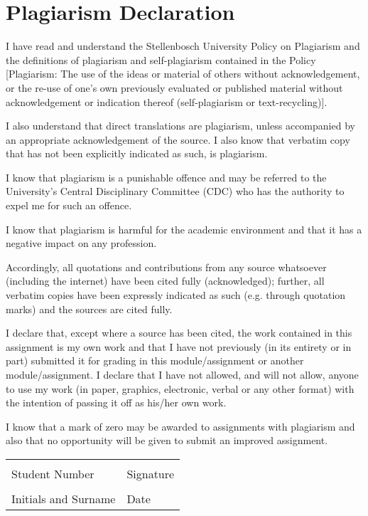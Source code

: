 \chapter*{Plagiarism Declaration}

I have read and understand the Stellenbosch University Policy on Plagiarism and the definitions of plagiarism and self-plagiarism contained in the Policy [Plagiarism: The use of the ideas or material of others without acknowledgement, or the re-use of one's own previously evaluated or published material without acknowledgement or indication thereof (self-plagiarism or text-recycling)].

I also understand that direct translations are plagiarism, unless accompanied by an appropriate acknowledgement of the source. I also know that verbatim copy that has not been explicitly indicated as such, is plagiarism.

I know that plagiarism is a punishable offence and may be referred to the University's Central Disciplinary Committee (CDC) who has the authority to expel me for such an offence.

I know that plagiarism is harmful for the academic environment and that it has a negative impact on any profession.

Accordingly, all quotations and contributions from any source whatsoever (including the internet) have been cited fully (acknowledged); further, all verbatim copies have been expressly indicated as such (e.g. through quotation marks) and the sources are cited fully.

I declare that, except where a source has been cited, the work contained in this assignment is my own work and that I have not previously (in its entirety or in part) submitted it for grading in this module/assignment or another module/assignment.
I declare that I have not allowed, and will not allow, anyone to use my work (in paper, graphics, electronic, verbal or any other format) with the intention of passing it off as his/her own work.

I know that a mark of zero may be awarded to assignments with plagiarism and also that no opportunity will be given to submit an improved assignment.
\vspace{1.5cm}

\vspace{1cm}

\begin{table}[H]
\centering
\small %
\setlength{\tabcolsep}{4pt} %
\begin{tabular}{|p{}|p{}|}
\hline
& \\
Student Number & Signature \\ \hline
& \\
Initials and Surname & Date \\ \hline
\end{tabular}%
\end{table}

